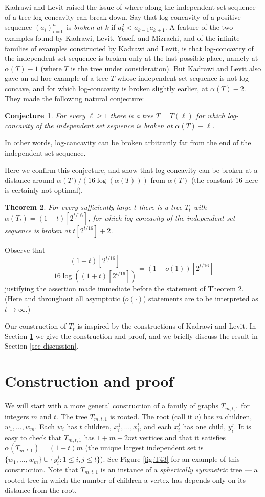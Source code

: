 \documentclass[12pt]{article}
\newtheorem{thm}{Theorem}[section]
\newtheorem{conj}[thm]{Conjecture}
\theoremstyle{definition}
\theoremstyle{definition}
\theoremstyle{definition}
\theoremstyle{definition}
\theoremstyle{definition}
\theoremstyle{definition}
\theoremstyle{definition}
\theoremstyle{definition}
\theoremstyle{remark}
\begin{document}
Kadrawi and Levit raised the issue of where along the independent set sequence of a tree log-concavity can break down. Say that log-concavity of a positive sequence $(a_i)_{i=0}^n$ is {\it broken at $k$} if $a_k^2 < a_{k-1}a_{k+1}$. A feature of the two examples found by Kadrawi, Levit, Yosef, and Mizrachi, and of the infinite families of examples constructed by Kadrawi and Levit, is that log-concavity of the independent set sequence is broken only at the last possible place, namely at $\alpha(T)-1$ (where $T$ is the tree under consideration). But Kadrawi and Levit also gave an ad hoc example of a tree $T$ whose independent set sequence is not log-concave, and for which log-concavity is broken slightly earlier, at $\alpha(T)-2$. They made the following natural conjecture:
\begin{conj} \label{conj-KL}
For every $\ell \geq 1$ there is a tree $T=T(\ell)$ for which log-concavity of the independent set sequence is broken at $\alpha(T)-\ell$.  
\end{conj}
In other words, log-cancavity can be broken arbitrarily far from the end of the independent set sequence. 

Here we confirm this conjecture, and show that log-concavity can be broken at a distance around $\alpha(T)/(16\log(\alpha(T)))$ from $\alpha(T)$ (the constant $16$ here is certainly not optimal).
\begin{thm} \label{thm-Theta(root(alpha))}
For every sufficiently large $t$ there is a tree $T_t$ with $\alpha(T_t) = (1+t)[2^{t/16}]$, for which log-concavity of the independent set sequence is broken at $t[2^{t/16}]+2$.
\end{thm}
Observe that
$$
\frac{(1+t)[2^{t/16}]}{16\log\left((1+t)[2^{t/16}]\right)} = (1+o(1))[2^{t/16}]
$$
justifying the assertion made immediate before the statement of Theorem \ref{thm-Theta(root(alpha))}.  
(Here and throughout all asymptotic ($o(\cdot)$) statements are to be interpreted as $t \rightarrow \infty$.)

Our construction of $T_t$ is inspired by the constructions of Kadrawi and Levit. 
In Section \ref{sec-construction_and_proof} we give the construction and proof, and we briefly discuss the result in Section \ref{sec-discussion}.
\section{Construction and proof} \label{sec-construction_and_proof}

We will start with a more general construction of a family of graphs $T_{m,t,1}$ for integers $m$ and $t$. The tree $T_{m,t,1}$ is rooted. The root (call it $v$) has $m$ children, $w_1, \ldots, w_m$. Each $w_i$ has $t$ children, $x_i^1, \ldots, x_i^t$, and each $x_i^j$ has one child, $y_i^j$. It is easy to check that $T_{m,t,1}$ has $1+m+2mt$ vertices and that it satisfies $\alpha(T_{m,t,1}) = (1+t)m$ (the unique largest independent set is $\{w_1, \ldots, w_m\} \cup \{y_i^j:1 \leq i, j \leq t\}$). See Figure \ref{fig:T43} for an example of this construction. Note that $T_{m,t,1}$ is an instance of a \emph{spherically symmetric} tree --- a rooted tree in which the number of children a vertex has depends only on its distance from the root. 
\end{document}
